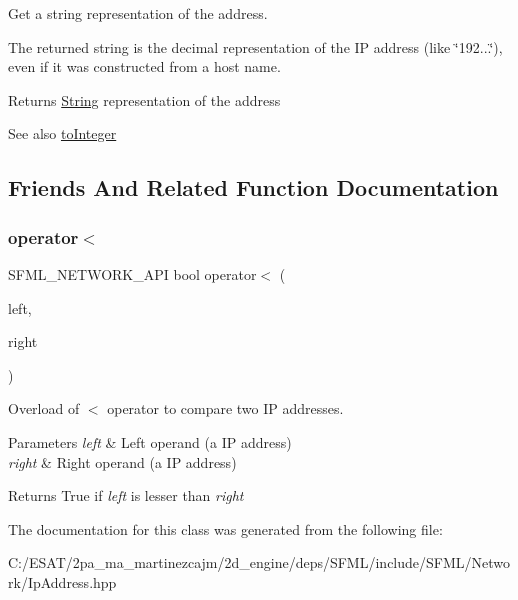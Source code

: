 Get a string representation of the address. 

The returned string is the decimal representation of the IP address (like \char`\"{}192...\char`\"{}), even if it was constructed from a host name.

\begin{DoxyReturn}{Returns}
\hyperlink{classsf_1_1_string}{String} representation of the address
\end{DoxyReturn}
\begin{DoxySeeAlso}{See also}
\hyperlink{classsf_1_1_ip_address_ae7911c5ea9562f9602c3e29cd54b15e9}{to\+Integer} 
\end{DoxySeeAlso}


\subsection{Friends And Related Function Documentation}
\mbox{\label{classsf_1_1_ip_address_a1c4ae6b26e9df765ca57d2715e9a7885}} 
\subsubsection{\texorpdfstring{operator$<$}{operator<}}
{\footnotesize\ttfamily S\+F\+M\+L\+\_\+\+N\+E\+T\+W\+O\+R\+K\+\_\+\+A\+PI bool operator$<$ (\begin{DoxyParamCaption}\item[{const \hyperlink{classsf_1_1_ip_address}{Ip\+Address} \&}]{left,  }\item[{const \hyperlink{classsf_1_1_ip_address}{Ip\+Address} \&}]{right }\end{DoxyParamCaption})\hspace{0.3cm}{\ttfamily [friend]}}



Overload of $<$ operator to compare two IP addresses. 


\begin{DoxyParams}{Parameters}
{\em left} & Left operand (a IP address) \\
\hline
{\em right} & Right operand (a IP address)\\
\hline
\end{DoxyParams}
\begin{DoxyReturn}{Returns}
True if {\itshape left} is lesser than {\itshape right} 
\end{DoxyReturn}


The documentation for this class was generated from the following file\+:\begin{DoxyCompactItemize}
\item 
C\+:/\+E\+S\+A\+T/2pa\+\_\+ma\+\_\+martinezcajm/2d\+\_\+engine/deps/\+S\+F\+M\+L/include/\+S\+F\+M\+L/\+Network/Ip\+Address.\+hpp\end{DoxyCompactItemize}
